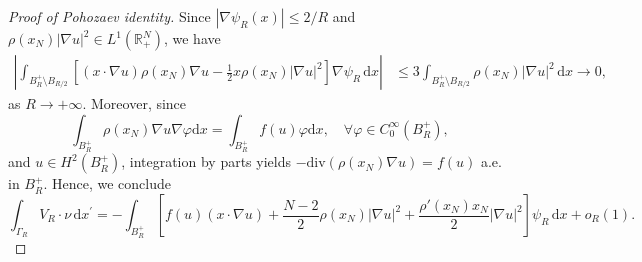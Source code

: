 \documentclass[12pt,reqno]{amsart}
\begin{document}
\begin{proof}[Proof of Pohozaev identity]
Since $|\nabla \psi_{R}(x)|\leq2/R$ and $\rho(x_N)|\nabla u|^2\in L^1(\mathds{R}^N_+)$, we have   
		\begin{align*}
			\left|\int_{B_{R}^+\setminus B_{R/2}}\left[(x\cdot\nabla u)\rho(x_N)\nabla u - \frac{1}{2}x\rho(x_N)|\nabla u|^2\right]\nabla\psi_{R}\,\mathrm{d}x\right|          
			&\leq 3\int_{B_{R}^+\setminus B_{R/2}}\rho(x_N)|\nabla u|^2\,\mathrm{d}x\longrightarrow 0,
		\end{align*}
		as $R\longrightarrow+\infty$.
Moreover, since
\begin{equation*}
    \int_{B_R^+}\rho(x_N)\nabla u\nabla \varphi\mathrm{d}x=\int_{B_R^+}f(u)\varphi\mathrm{d}x,\quad \forall \varphi \in C^{\infty}_0(B_R^+),
\end{equation*}
and $u \in H^2(B_R^+)$, integration by parts yields $-\mathrm{div}(\rho(x_N)\nabla u)=f(u)$ a.e. in $B_R^+$. Hence, we conclude        
\begin{equation*}
\int_{\Gamma_R}V_{R}\cdot\nu\,\mathrm{d}x^\prime =-\int_{ B_R^+}\left[f(u)(x\cdot\nabla u)+\frac{N-2}{2}\rho(x_N)|\nabla u|^2+\frac{\rho'(x_N)x_N}{2} |\nabla u|^2\right]\psi_{R}\,\mathrm{d}x+ o_R(1).    
\end{equation*}        
        

\end{proof}
\end{document}
